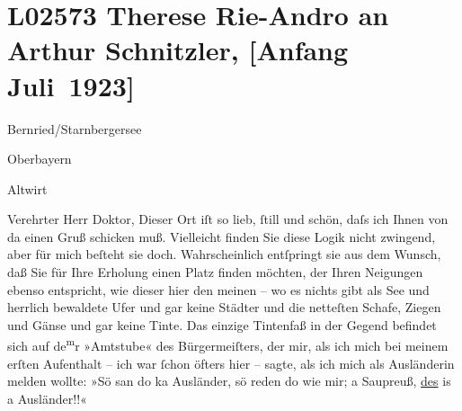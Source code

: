 

\section[Therese Rie-Andro an Arthur Schnitzler, {[}Anfang Juli 1923{]}]{L02573 Therese Rie-Andro an Arthur Schnitzler, {[}Anfang Juli 1923{]}}
\nopagebreak{}
\rehead{ }\normalsize\beginnumbering{}
\toendnotes[C]{\smallbreak\pagebreak[2]}
\toendnotes[C]{\smallbreak}
\pstart
           \raggedleft{}{\pb}Bernried/Starnbergersee\pend
           
\pstart
           \raggedleft{}Oberbayern\pend
           
\pstart
           \raggedleft{}Altwirt\pend
           
\pstart{}Verehrter Herr Doktor,\pend\vspace{0.5em}
\pstart
           Dieser Ort iſt so lieb,{ }ſtill und schön, daſs ich Ihnen von da einen Gruß schicken
               muß. Vielleicht finden Sie diese Logik nicht zwingend, aber für mich beſteht sie
               doch. Wahrscheinlich entſpringt sie aus dem Wunsch, daß Sie für Ihre Erholung einen
               Platz finden möchten, der Ihren Neigungen ebenso entspricht, wie dieser hier den
               meinen – wo es nichts gibt als See und herrlich bewaldete Ufer und gar keine Städter
               und die netteſten Schafe, Ziegen und Gänse und gar keine Tinte. {\pb}Das einzige Tintenfaß in der Gegend befindet sich auf de\substVorne{}\textsuperscript{m}\substDazwischen{}r\substHinten{} »Amtstube« des Bürgermeiſters, der mir, als ich mich bei meinem erſten
               Aufenthalt – ich war{ }ſchon öfters hier – sagte, als ich mich als Ausländerin melden
               wollte: »Sö san do ka Ausländer, sö reden do wie mir; a Saupreuß, \uline{des} is a
               Ausländer!!«\pend
           
